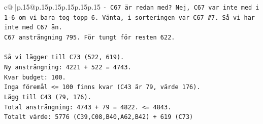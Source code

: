 \documentclass{article}
\begin{document}
{\begin{supertabular}{c@{$\;$}|p{.15\linewidth}@{}p{.15\linewidth}p{.15\linewidth}p{.15\linewidth}p{.15\linewidth}p{.15\linewidth}}
{{{\texttt{{-} C67 är redan med? Nej, C67 var inte med i 1{-}6 om vi bara tog topp 6. Vänta, i sorteringen var C67 \#7. Så vi har inte med C67 än.} \\
\texttt{C67 ansträngning 795. För tungt för resten 622.} \\
\\ 
\texttt{Så vi lägger till C73 (522, 619).} \\
\texttt{Ny ansträngning: 4221 + 522 = 4743.} \\
\texttt{Kvar budget: 100.} \\
\texttt{Inga föremål <= 100 finns kvar (C43 är 79, värde 176).} \\
\texttt{Lägg till C43 (79, 176).} \\
\texttt{Total ansträngning: 4743 + 79 = 4822. <= 4843.} \\
\texttt{Totalt värde: 5776 (C39,C08,B40,A62,B42) + 619 (C73)} \\
            }
        }
    }
     \\ \\


\end{supertabular}}
\end{document}
